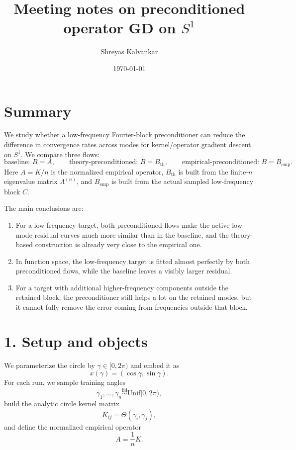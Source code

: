 \documentclass[11pt]{article}
\title{Meeting notes on preconditioned operator GD on $S^1$}
\author{Shreyas Kalvankar}
\date{\today}
\begin{document}
\maketitle

\section*{Summary}

We study whether a low-frequency Fourier-block preconditioner can reduce the
difference in convergence rates across modes for kernel/operator gradient descent on $S^1$.
We compare three flows:
\[
	\text{baseline: } B=A,
	\qquad
	\text{theory-preconditioned: } B=B_{\mathrm{th}},
	\qquad
	\text{empirical-preconditioned: } B=B_{\mathrm{emp}}.
\]
Here $A=K/n$ is the normalized empirical operator, $B_{\mathrm{th}}$ is built
from the finite-$n$ eigenvalue matrix $\Lambda^{(n)}$, and
$B_{\mathrm{emp}}$ is built from the actual sampled low-frequency block $C$.

The main conclusions are:

\begin{enumerate}
	\item For a low-frequency target, both preconditioned flows make the active
	      low-mode residual curves much more similar than in the baseline, and
	      the theory-based construction is already very close to the empirical one.

	\item In function space, the low-frequency target is fitted almost perfectly
	      by both preconditioned flows, while the baseline leaves a visibly larger residual.

	\item For a target with additional higher-frequency components outside the
	      retained block, the preconditioner still helps a lot on the retained
	      modes, but it cannot fully remove the error coming from frequencies
	      outside that block.
\end{enumerate}

\section*{1. Setup and objects}

We parameterize the circle by $\gamma \in [0,2\pi)$ and embed it as
\[
	x(\gamma)=(\cos\gamma,\sin\gamma).
\]
For each run, we sample training angles
\[
	\gamma_1,\dots,\gamma_n \overset{\mathrm{iid}}{\sim} \mathrm{Unif}[0,2\pi),
\]
build the analytic circle kernel matrix
\[
	K_{ij}=\Theta(\gamma_i,\gamma_j),
\]
and define the normalized empirical operator
\[
	A=\frac{1}{n}K.
\]
\end{document}
